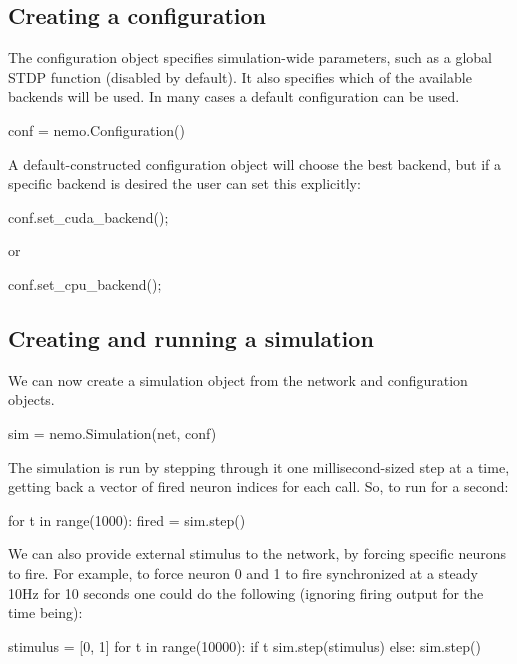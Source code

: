 \documentclass[a4paper]{article}
\begin{document}
\subsection{Creating a configuration}

The configuration object specifies simulation-wide parameters, 
	such as a global STDP function (disabled by default).
It also specifies which of the available backends
will be used.
In many cases a default configuration can be used.

\begin{python}
conf = nemo.Configuration()
\end{python}

A default-constructed configuration object will choose the best backend,
	but if a specific backend is desired the user can set this explicitly:

\begin{python}
conf.set_cuda_backend();
\end{python}

or

\begin{python}
conf.set_cpu_backend();
\end{python}

\subsection{Creating and running a simulation}

We can now create a simulation object from the network and configuration objects.

\begin{python}
sim = nemo.Simulation(net, conf)
\end{python}

The simulation is run by stepping through it one millisecond-sized step at a time,
getting back a vector of fired neuron indices for each call.
So, to run for a second:

\begin{python}
for t in range(1000):
	fired = sim.step()
\end{python}

We can also provide external stimulus to the network, by forcing specific neurons to fire.
For example, to force neuron 0 and 1 to fire synchronized at a steady 10Hz for 10 seconds
	one could do the following (ignoring firing output for the time being):

\begin{python}
stimulus = [0, 1]
for t in range(10000):
	if t %
		sim.step(stimulus)
	else:
		sim.step()
\end{python}
\end{document}
